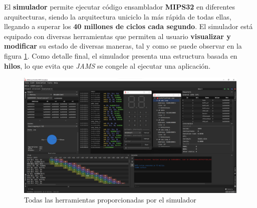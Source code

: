 El \textbf{simulador} permite ejecutar código ensamblador
\textbf{MIPS32} en diferentes arquitecturas, siendo la arquitectura
uniciclo la más rápida de todas ellas, llegando a superar los
\textbf{40 millones de ciclos cada segundo}.
El simulador está equipado con diversas herramientas que
permiten al usuario \textbf{visualizar y modificar} su estado
de diversas maneras, tal y como se puede observar en la figura \ref{fig:mips-tools}.
Como detalle final, el simulador presenta una estructura basada en
\textbf{hilos}, lo que evita que \textit{JAMS} se congele al ejecutar
una aplicación.

\begin{figure}[h]
    \centering
    \includegraphics[width=\textwidth]{images/result/mips-tools}
    \caption{Todas las herramientas proporcionadas por el simulador}
    \label{fig:mips-tools}
\end{figure}
